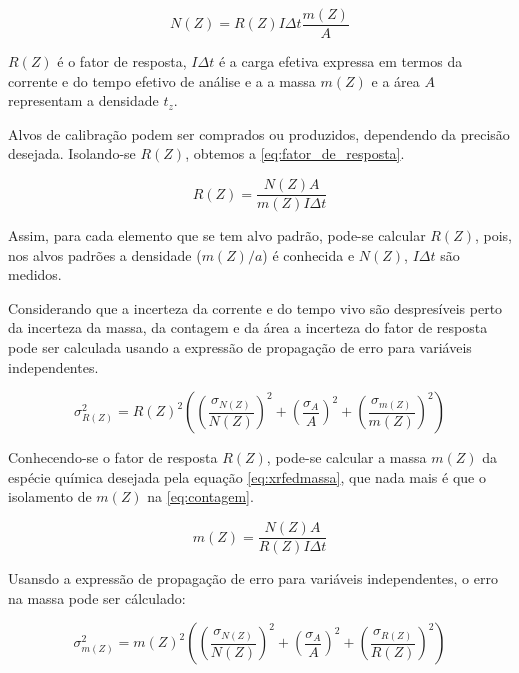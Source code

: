 \begin{equation}
  \label{eq:contagem}
  N(Z) = R(Z) I\Delta t \frac{m(Z)}{A}
\end{equation}

$R(Z)$ é o fator de resposta, $I\Delta t$ é a carga efetiva expressa
em termos da corrente e do tempo efetivo de análise e a 
a massa $m(Z)$ e a área $A$ representam a densidade $t_z$. 

Alvos de calibração podem ser comprados ou produzidos, dependendo da 
precisão desejada. Isolando-se $R(Z)$, obtemos a \ref{eq:fator_de_resposta}.

\begin{equation}
  \label{eq:fator_de_resposta}
  R(Z) = \frac{N(Z) A}{m(Z)I \Delta t}
\end{equation}

Assim, para cada elemento que se tem alvo padrão, pode-se calcular $R(Z)$,
pois, nos alvos padrões a densidade ($m(Z)/a$) é conhecida e $N(Z)$, $I \Delta t$ são medidos. 

Considerando que a incerteza da corrente e do tempo vivo são 
despresíveis perto da incerteza da massa, da contagem e da área 
a incerteza do fator de resposta pode ser calculada usando a expressão
de propagação de erro para variáveis independentes.

\begin{equation}
  \label{eq:erro_fator_de_resposta}
  \sigma_{R(Z)}^2 = {R(Z)}^2 \left( \left(\frac{\sigma_{N(Z)}}{N(Z)}\right)^2 + 
                                  \left(\frac{\sigma_A}{A}\right)^2 + 
                                  \left(\frac{\sigma_{m(Z)}}{m(Z)}\right)^2 
                           \right)
\end{equation}

Conhecendo-se o fator de resposta $R(Z)$, pode-se calcular a massa $m(Z)$ da espécie química
desejada pela equação \ref{eq:xrfedmassa}, que nada mais é que o isolamento de $m(Z)$ na 
\ref{eq:contagem}. 

\begin{equation}
  \label{eq:xrfedmassa}
  m(Z) = \frac{N(Z) A}{ R(Z)I \Delta t}
\end{equation}

Usansdo a expressão de propagação de erro para variáveis independentes, 
o erro na massa pode ser cálculado:

\begin{equation}
  \label{eq:erro_massa}
  \sigma_{m(Z)}^2 = {m(Z)}^2 \left( \left(\frac{\sigma_{N(Z)}}{N(Z)}\right)^2 + 
                                  \left(\frac{\sigma_A}{A}\right)^2 + 
                                  \left(\frac{\sigma_{R(Z)}}{R(Z)}\right)^2 
                           \right)
\end{equation}


